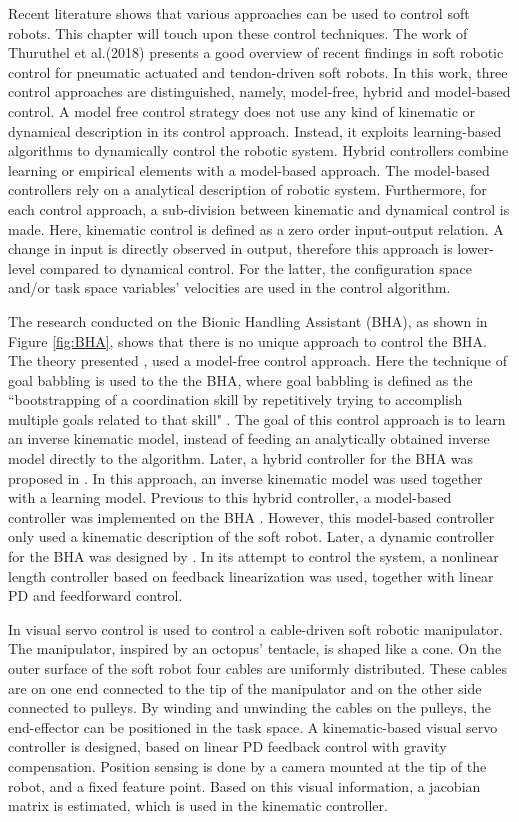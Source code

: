 Recent literature shows that various approaches can be used to control soft robots. This chapter will touch upon these control techniques. The work of Thuruthel et al.(2018) \cite{george2018control} presents a good overview of recent findings in soft robotic control for pneumatic actuated and tendon-driven soft robots. In this work, three control approaches are distinguished, namely, model-free, hybrid and model-based control. A model free control strategy does not use any kind of kinematic or dynamical description in its control approach. Instead, it exploits learning-based algorithms to dynamically control the robotic system. Hybrid controllers combine learning or empirical elements with a model-based approach. The model-based controllers rely on a analytical description of robotic system. Furthermore, for each control approach, a sub-division between kinematic and dynamical control is made. Here, kinematic control is defined as a zero order input-output relation. A change in input is directly observed in output, therefore this approach is lower-level compared to dynamical control. For the latter, the configuration space and/or task space variables' velocities are used in the control algorithm. 


The research conducted on the Bionic Handling Assistant (BHA), as shown in Figure \ref{fig:BHA}, shows that there is no unique approach to control the BHA. The theory presented \cite{rolf2013efficient}, used a model-free control approach. Here the technique of goal babbling is used to the the BHA, where goal babbling is defined as the ``bootstrapping of a coordination skill by repetitively trying to accomplish multiple goals related to that skill" \cite{rolf2012goal}. The goal of this control approach is to learn an inverse kinematic model, instead of feeding an analytically obtained inverse model directly to the algorithm. Later, a hybrid controller for the BHA was proposed in \cite{reinhart2017hybrid}. In this approach, an inverse kinematic model was used together with a learning model. Previous to this hybrid controller, a model-based controller was implemented on the BHA \cite{mahl2014bhakin}. However, this model-based controller only used a kinematic description of the soft robot. Later, a dynamic controller for the BHA was designed by \cite{falkenhahn2016dynamic}. In its attempt to control the system, a nonlinear length controller based on feedback linearization was used, together with linear PD and feedforward control. 

In \cite{wang2013visual} visual servo control is used to control a cable-driven soft robotic manipulator. The manipulator, inspired by an octopus' tentacle, is shaped like a cone. On the outer surface of the soft robot four cables are uniformly distributed. These cables are on one end connected to the tip of the manipulator and on the other side connected to pulleys. By winding and unwinding the cables on the pulleys, the end-effector can be positioned in the task space. A kinematic-based visual servo controller is designed, based on linear PD feedback control with gravity compensation. Position sensing is done by a camera mounted at the tip of the robot, and a fixed feature point. Based on this visual information, a jacobian matrix is estimated, which is used in the kinematic controller.


